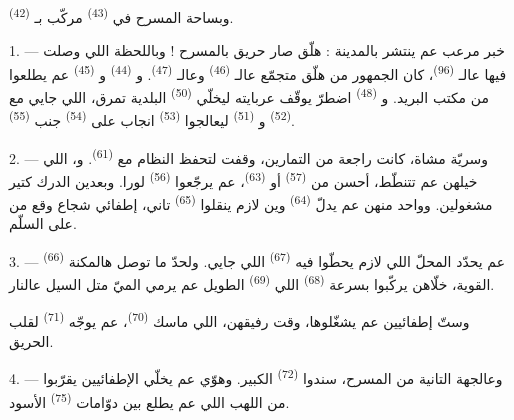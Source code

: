 وبساحة المسرح في  \textsuperscript{(43)} مركّب
بـ \textsuperscript{(42)}.

\VUsaut{5.0mm}
\VUsaut{3.0mm}

\VUsaut{3.4mm}

1. --- خبر مرعب عم ينتشر بالمدينة : هلّق صار حريق بالمسرح ! وباللحظة
اللي وصلت فيها عالـ \textsuperscript{(96)}، كان الجمهور من
هلّق متجمّع عالـ \textsuperscript{(46)} وعالـ
\textsuperscript{(47)}. و \textsuperscript{(44)}
و \textsuperscript{(45)} عم يطلعوا من مكتب البريد.
و \textsuperscript{(48)} اضطرّ يوقّف عربايته
ليخلّي  \textsuperscript{(50)} البلدية تمرق، اللي
جايي مع  \textsuperscript{(52)} و
\textsuperscript{(51)} ليعالجوا  \textsuperscript{(53)}
انجاب على  \textsuperscript{(54)} جنب  \textsuperscript{(55)}.

2. --- وسريّة مشاة، كانت راجعة من التمارين، وقفت لتحفظ النظام مع
 \textsuperscript{(61)}. و،
اللي خيلهن عم تتنطّط، أحسن من  \textsuperscript{(57)} أو
 \textsuperscript{(63)}، عم يرجّعوا 
\textsuperscript{(56)} لورا. وبعدين الدرك كتير مشغولين.
وواحد منهن عم يدلّ  \textsuperscript{(64)} وين لازم ينقلوا
 \textsuperscript{(65)} تاني، إطفائي شجاع وقع من على السلّم.

3. ---  \textsuperscript{(66)} عم يحدّد المحلّ اللي لازم
يحطّوا فيه  \textsuperscript{(67)} اللي جايي. ولحدّ
ما توصل هالمكنة القوية، خلّاهن يركّبوا بسرعة 
\textsuperscript{(68)} اللي  \textsuperscript{(69)} الطويل
عم يرمي الميّ متل السيل عالنار.

وستّ إطفائيين عم يشغّلوها، وقت رفيقهن، اللي ماسك 
\textsuperscript{(70)}، عم يوجّه  \textsuperscript{(71)}
لقلب الحريق.

4. --- وعالجهة التانية من المسرح، سندوا 
\textsuperscript{(72)} الكبير. وهوّي عم يخلّي الإطفائيين يقرّبوا من
اللهب اللي عم يطلع بين دوّامات  \textsuperscript{(75)}
الأسود.

\VUsaut{5.0mm}
\VUsaut{3.4mm}


